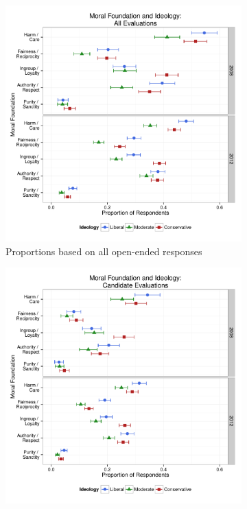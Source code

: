\documentclass[12pt]{article}
\begin{document}
\begin{figure}[h]
  \centering
  \caption{Weighted proportion of Respondents mentioning each of the moral foundations in any of their open-ended responses, along with 95\% confidence intervals.}
  \begin{subfigure}[t]{0.49\textwidth}
    \includegraphics[scale=.4]{../calc/fig/appC1prop.pdf}
\caption{Proportions based on all open-ended responses}\label{fig:appC1prop}
  \end{subfigure}
  \begin{subfigure}[t]{0.49\textwidth}
    \includegraphics[scale=.4]{../calc/fig/appC2cand.pdf}

\end{subfigure}
\end{figure}
\end{document}
